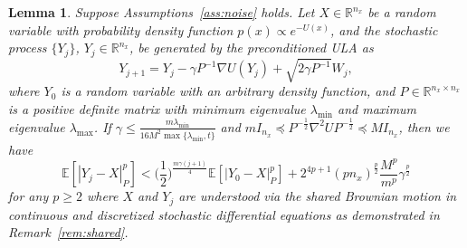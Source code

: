 \documentclass[11pt]{article}
\theoremstyle{plain}
\newtheorem{lem}[thm]{Lemma}
\theoremstyle{definition}
\theoremstyle{remark}
\begin{document}
\begin{lem}\label{lem:ula}
Suppose Assumptions~\ref{ass:noise} holds.
Let $X \in \mathbb{R}^{n_x}$ be a random variable with probability density function $p(x) \propto e^{-U(x)}$, and the stochastic process $\{ Y_j\}$, $Y_j  \in \mathbb{R}^{n_x}$, be generated by the preconditioned ULA as
\[
Y_{j+1} = Y_j - \gamma P^{-1} \nabla U(Y_j) + \sqrt{2\gamma P^{-1}} W_j,
\]
where $Y_0$ is a random variable with an arbitrary density function, and 
$P \in \mathbb{R}^{n_x \times n_x}$ is a positive definite matrix with minimum eigenvalue $\lambda_{\min}$ and maximum eigenvalue $\lambda_{\max}$.
If  $\gamma \leq \frac{m \lambda_{\min}}{16 M^2 \max\{\lambda_{\min},t\}}$ and  $m I_{n_x} \preceq P^{-\frac{1}{2}}\nabla^2U P^{-\frac{1}{2}}\preceq MI_{n_x}$, then we have  
\[
\mathbb{E} [ | Y_j - X |_P^p ] < \bigg (
\frac{1}{2}
\bigg )^{\frac{m \gamma (j+1) }{4}} \mathbb{E} [ | Y_0 - X|_P^p]
+ 2^{4p+1} (pn_x)^{\frac{p}{2}} \frac{M^p}{m^p} \gamma^{\frac{p}{2}}
\]
for any $p\geq 2$ where $X$ and $Y_j$ are understood via the shared Brownian motion in continuous and discretized stochastic differential equations as demonstrated in Remark~\ref{rem:shared}.
\end{lem}
\end{document}
